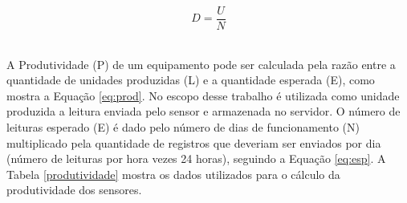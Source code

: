 \begin{equation}
  D = \frac{U}{N}
  \label{eq:disp}
\end{equation}
\newpage
\begin{center}
\label{disponibilidade}
\end{center}


\\\null \quad A Produtividade (P) de um equipamento pode ser calculada pela razão entre a quantidade de unidades produzidas (L) e a quantidade esperada (E), como mostra a Equação \ref{eq:prod}. No escopo desse trabalho é utilizada como unidade produzida a leitura enviada pelo sensor e armazenada no servidor. O número de leituras esperado (E) é dado pelo número de dias de funcionamento (N) multiplicado pela quantidade de registros que deveriam ser enviados por dia (número de leituras por hora vezes 24 horas), seguindo a Equação \ref{eq:esp}. A Tabela \ref{produtividade} mostra os dados utilizados para o cálculo da produtividade dos sensores.

